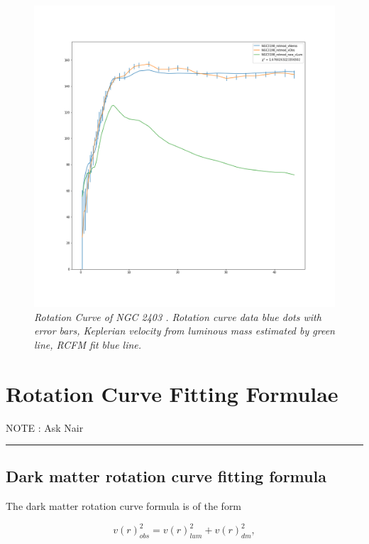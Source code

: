 \documentclass[reprint,%
 amsmath,amssymb,
 aps,
]{revtex4-1}
\begin{document}
 \begin{figure}[h!]
      \centering
      \includegraphics[width=\linewidth]{figures/NGC3198_rotmod_XueSofue.png}
      \caption{\emph{Rotation Curve of NGC 2403 \cite{Blok1}.   Rotation curve data blue dots with  error bars,  Keplerian velocity from luminous mass estimated by   green line,   RCFM fit blue line.} }
      \label{fig:NGC2403}
  \end{figure}
\section{Rotation Curve Fitting Formulae  \label{sec:dos}}
 
{\color{red}NOTE :  Ask Nair   }
{\color{red} \rule{\linewidth}{0.5mm}}
 \subsection{Dark matter rotation curve fitting formula}
 
  

 The   dark matter rotation curve formula   is of the form

 \begin{equation}
v(r)^2_{obs}  =  v(r)^2_{lum}  +  v(r)^2_{dm},   
\label{eq:zonte1}
\end{equation} 
\end{document}
